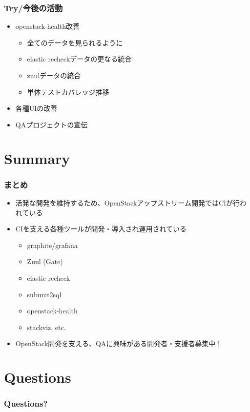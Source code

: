 \documentclass[aspectratio=169,11pt,hyperref={colorlinks=true}]{beamer}
\begin{document}
\begin{frame}
  \frametitle{Try/今後の活動}
  \begin{itemize}
    \item openstack-health改善
    \begin{itemize}
      \item 全てのデータを見られるように
      \item elastic recheckデータの更なる統合
      \item zuulデータの統合
      \item 単体テストカバレッジ推移
    \end{itemize}
    \item 各種UIの改善
    \item QAプロジェクトの宣伝
  \end{itemize}
\end{frame}

\section{Summary}
\begin{frame}
  \frametitle{まとめ}
  \begin{itemize}
    \item 活発な開発を維持するため、OpenStackアップストリーム開発ではCIが行われている
    \item CIを支える各種ツールが開発・導入され運用されている
    \begin{itemize}
      \item graphite/grafana
      \item Zuul (Gate)
      \item elastic-recheck
      \item subunit2sql
      \item openstack-health
      \item stackviz, etc.
    \end{itemize}
    \item OpenStack開発を支える、QAに興味がある開発者・支援者募集中！
  \end{itemize}
\end{frame}

\section{Questions}
\begin{frame}
  \frametitle{Questions?}
\end{frame}
\end{document}
